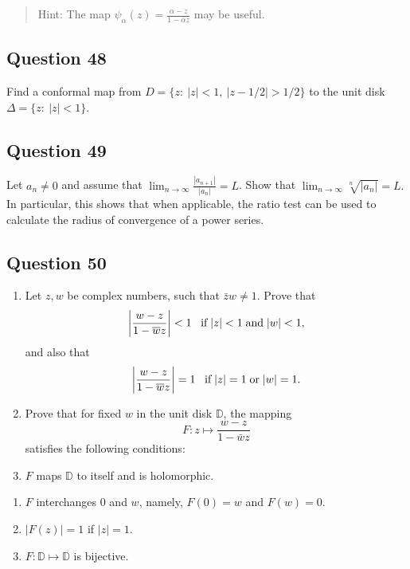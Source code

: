 \documentclass[12pt]{article}
\begin{document}
\begin{quote}
Hint: The map
\(\displaystyle{\psi_{\alpha}(z)=\frac{\alpha-z}{1-\bar{\alpha}z}}\) may
be useful.
\end{quote}

\hypertarget{question-48-2}{%
\subsection{Question 48}\label{question-48-2}}

Find a conformal map from \(D = \{z :\  |z| < 1,\ |z - 1/2| > 1/2\}\) to
the unit disk \(\Delta=\{z: \ |z|<1\}\).

\hypertarget{question-49-2}{%
\subsection{Question 49}\label{question-49-2}}

Let \(a_n \neq 0\) and assume that
\(\displaystyle \lim_{n \rightarrow \infty} \frac{|a_{n+1}|}{|a_n|} = L\).
Show that
\(\displaystyle \lim_{n \rightarrow \infty} \sqrt[n]{|a_n|} = L. %
\) In particular, this shows that when applicable, the ratio test can be
used to calculate the radius of convergence of a power series.

\hypertarget{question-50-2}{%
\subsection{Question 50}\label{question-50-2}}

\begin{enumerate}
\def\labelenumi{(\alph{enumi})}
\item
  Let \(z, w\) be complex numbers, such that \(\bar{z} w \neq 1\). Prove
  that
  \[{\left\lvert {\frac{w - z}{1 - \overline{w} z}} \right\rvert} < 1 \; \; \; \mbox{if} \; |z| < 1 \; \mbox{and}\; |w| < 1,\]
  and also that
  \[{\left\lvert {\frac{w - z}{1 - \overline{w} z}} \right\rvert} = 1 \; \; \; \mbox{if} \; |z| = 1 \; \mbox{or}\; |w| = 1.\]
\item
  Prove that for fixed \(w\) in the unit disk \(\mathbb D\), the mapping
  \[F: z \mapsto \frac{w - z}{1 - \bar{w} z}\] satisfies the following
  conditions:
\item
  \(F\) maps \(\mathbb D\) to itself and is holomorphic.~
\end{enumerate}

\begin{enumerate}
\def\labelenumi{(\roman{enumi})}
\setcounter{enumi}{1}
\item
  \(F\) interchanges \(0\) and \(w\), namely, \(F(0) = w\) and
  \(F(w) = 0\).
\item
  \(|F(z)| = 1\) if \(|z| = 1\).
\item
  \(F: {\mathbb D} \mapsto {\mathbb D}\) is bijective.
\end{enumerate}
\end{document}

